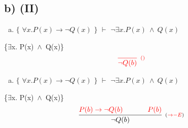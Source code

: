 \documentclass[aspectratio=43]{beamer}
\newcommand{\ex}{$\exists$}
\newcommand{\nao}{$\neg$}
\newcommand{\andd}{$\wedge$}
\begin{document}
    \subsection{b) (II)}
    
    \begin{frame}[fragile]
    	
    	\begin{enumerate}[b)]
			
			\item $\{$ $\forall x.P(x)\to \neg Q(x)$ $\}$ $\vdash$ $ \neg\exists  x.P(x)\ \wedge\ Q(x)$ \\ 
			
		\end{enumerate}
        \{\ex  x. P(x)\ \andd\ Q(x)\}
        \vspace{100pt}
        \[
        \begin{array}{c}
		
        	\textcolor{red}{
            \infer[_{()}]
            {$\nao$ Q(b)}
            {}
            }
		\end{array}
        \]
        
	\end{frame}
    
    \begin{frame}[fragile]
    	
    	\begin{enumerate}[b)]
			
			\item $\{$ $\forall x.P(x)\to \neg Q(x)$ $\}$ $\vdash$ $ \neg\exists  x.P(x)\ \wedge\ Q(x)$ \\ 
			
		\end{enumerate}
        \{\ex  x. P(x)\ \andd\ Q(x)\}
        \vspace{95pt}
        \[
        \begin{array}{c}
		
        	\infer[_{(\textcolor{red}{\to-E})}]
            {$\nao$ Q(b)}
            {\textcolor{red}{
            P(b) \rightarrow \neg Q(b) 
            \hspace{35pt}
            P(b)
            }
            }
		\end{array}
        \]
        
	\end{frame}
    
\end{document}
